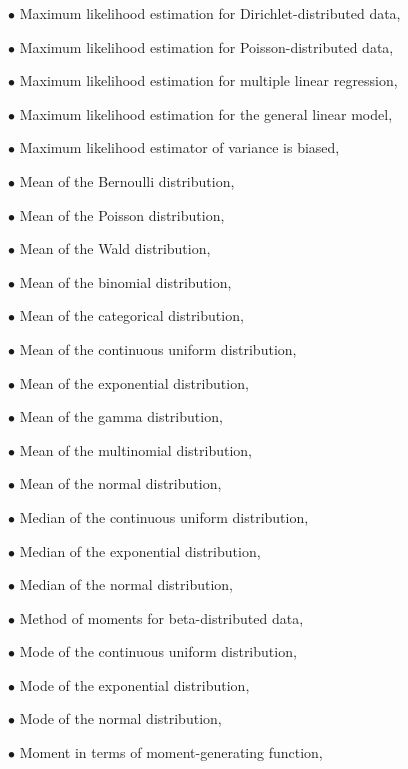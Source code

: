 \documentclass[a4paper,12pt,twoside]{book}
\begin{document}
$\bullet$ Maximum likelihood estimation for Dirichlet-distributed data, \pageref{sec:dir-mle}

$\bullet$ Maximum likelihood estimation for Poisson-distributed data, \pageref{sec:poiss-mle}

$\bullet$ Maximum likelihood estimation for multiple linear regression, \pageref{sec:mlr-mle}

$\bullet$ Maximum likelihood estimation for the general linear model, \pageref{sec:glm-mle}

$\bullet$ Maximum likelihood estimator of variance is biased, \pageref{sec:resvar-bias}

$\bullet$ Mean of the Bernoulli distribution, \pageref{sec:bern-mean}

$\bullet$ Mean of the Poisson distribution, \pageref{sec:poiss-mean}

$\bullet$ Mean of the Wald distribution, \pageref{sec:wald-mean}

$\bullet$ Mean of the binomial distribution, \pageref{sec:bin-mean}

$\bullet$ Mean of the categorical distribution, \pageref{sec:cat-mean}

$\bullet$ Mean of the continuous uniform distribution, \pageref{sec:cuni-mean}

$\bullet$ Mean of the exponential distribution, \pageref{sec:exp-mean}

$\bullet$ Mean of the gamma distribution, \pageref{sec:gam-mean}

$\bullet$ Mean of the multinomial distribution, \pageref{sec:mult-mean}

$\bullet$ Mean of the normal distribution, \pageref{sec:norm-mean}

$\bullet$ Median of the continuous uniform distribution, \pageref{sec:cuni-med}

$\bullet$ Median of the exponential distribution, \pageref{sec:exp-med}

$\bullet$ Median of the normal distribution, \pageref{sec:norm-med}

$\bullet$ Method of moments for beta-distributed data, \pageref{sec:beta-mom}

$\bullet$ Mode of the continuous uniform distribution, \pageref{sec:cuni-med}

$\bullet$ Mode of the exponential distribution, \pageref{sec:exp-mode}

$\bullet$ Mode of the normal distribution, \pageref{sec:norm-mode}

$\bullet$ Moment in terms of moment-generating function, \pageref{sec:mom-mgf}
\end{document}
